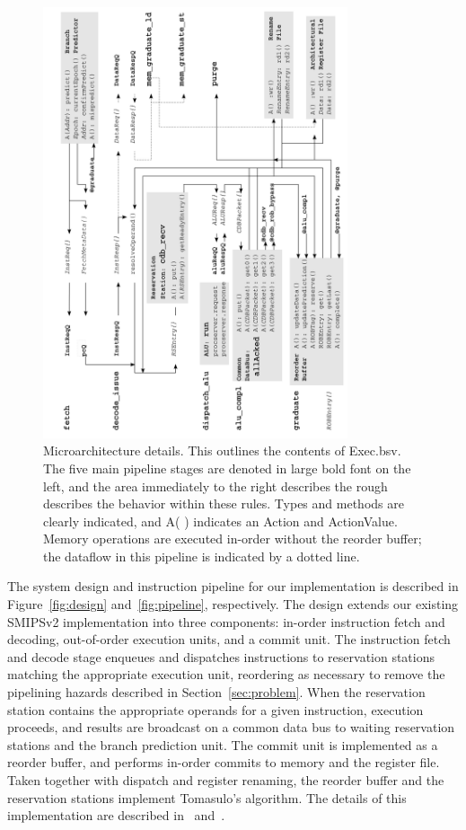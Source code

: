\documentclass[12pt]{article}
\begin{document}
\begin{figure} \centering
\includegraphics[width=0.80\textwidth]{figures/micro_arch.png}
\caption{Microarchitecture details. This outlines the contents of Exec.bsv.
The five main pipeline stages are denoted in large bold font on the left, and
the area immediately to the right describes the rough describes the behavior
within these rules. Types and methods are clearly indicated, and A( )
indicates an Action and ActionValue. Memory operations are executed in-order
without the reorder buffer; the dataflow in this pipeline is indicated by a
dotted line. \label{fig:microarchitecture}} 
\end{figure}

The system design and instruction pipeline for our implementation is described
in Figure~\ref{fig:design} and~\ref{fig:pipeline}, respectively. The design
extends our existing SMIPSv2 implementation into three components: in-order
instruction fetch and decoding, out-of-order execution units, and a commit
unit. The instruction fetch and decode stage enqueues and dispatches
instructions to reservation stations matching the appropriate execution unit,
reordering as necessary to remove the pipelining hazards described in
Section~\ref{sec:problem}. When the reservation station contains the
appropriate operands for a given instruction, execution proceeds, and results
are broadcast on a common data bus to waiting reservation stations and the
branch prediction unit. The commit unit is implemented as a reorder buffer,
and performs in-order commits to memory and the register file. Taken together
with dispatch and register renaming, the reorder buffer and the reservation
stations implement Tomasulo's algorithm. The details of this implementation
are described in~\cite{99KMP} and~\cite{0023143}.
\end{document}
